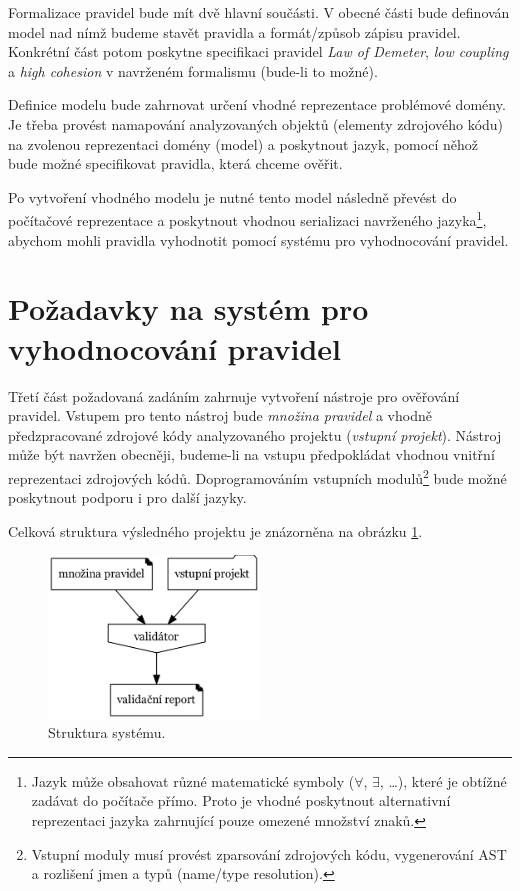 Formalizace pravidel bude mít dvě hlavní součásti. V obecné části bude definován model nad nímž budeme stavět pravidla a formát/způsob zápisu pravidel. Konkrétní část potom poskytne specifikaci pravidel \emph{Law of Demeter}, \emph{low coupling} a \emph{high cohesion} v navrženém formalismu (bude-li to možné).

Definice modelu bude zahrnovat určení vhodné reprezentace problémové domény. Je třeba provést namapování analyzovaných objektů (elementy zdrojového kódu) na zvolenou reprezentaci domény (model) a poskytnout jazyk, pomocí něhož bude možné specifikovat pravidla, která chceme ověřit.

Po vytvoření vhodného modelu je nutné tento model následně převést do počítačové reprezentace a poskytnout vhodnou serializaci navrženého jazyka\footnote{Jazyk může obsahovat různé matematické symboly ($\forall$, $\exists$, \ldots), které je obtížné zadávat do počítače přímo. Proto je vhodné poskytnout alternativní reprezentaci jazyka zahrnující pouze omezené množství znaků.}, abychom mohli pravidla vyhodnotit pomocí systému pro vyhodnocování pravidel.

\section{Požadavky na systém pro vyhodnocování pravidel}

Třetí část požadovaná zadáním zahrnuje vytvoření nástroje pro ověřování pravidel. Vstupem pro tento nástroj bude \emph{množina pravidel} a vhodně předzpracované zdrojové kódy analyzovaného projektu (\emph{vstupní projekt}). Nástroj může být navržen obecněji, budeme-li na vstupu předpokládat vhodnou vnitřní reprezentaci zdrojových kódů. Doprogramováním vstupních modulů\footnote{Vstupní moduly musí provést zparsování zdrojových kódu, vygenerování AST a rozlišení jmen a typů (name/type resolution).} bude možné poskytnout podporu i pro další jazyky.

Celková struktura výsledného projektu je znázorněna na obrázku \ref{requirements-system_structure}.

\begin{figure}[h!]
  \centering
  \includegraphics[width=0.5\textwidth]{./graphs/global_structure.png}
  \caption{Struktura systému.\label{requirements-system_structure}}
\end{figure}

